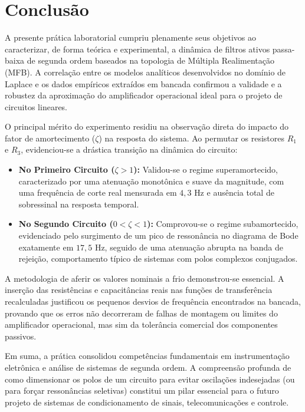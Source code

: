 \chapter{Conclusão}

A presente prática laboratorial cumpriu plenamente seus objetivos ao caracterizar, de forma teórica e experimental, a dinâmica de filtros ativos passa-baixa de segunda ordem baseados na topologia de Múltipla Realimentação (MFB). A correlação entre os modelos analíticos desenvolvidos no domínio de Laplace e os dados empíricos extraídos em bancada confirmou a validade e a robustez da aproximação do amplificador operacional ideal para o projeto de circuitos lineares.

O principal mérito do experimento residiu na observação direta do impacto do fator de amortecimento ($\zeta$) na resposta do sistema. Ao permutar os resistores $R_1$ e $R_3$, evidenciou-se a drástica transição na dinâmica do circuito:
\begin{itemize}
	\item \textbf{No Primeiro Circuito ($\zeta > 1$):} Validou-se o regime superamortecido, caracterizado por uma atenuação monotônica e suave da magnitude, com uma frequência de corte real mensurada em $4,3\text{ Hz}$ e ausência total de sobressinal na resposta temporal.
	\item \textbf{No Segundo Circuito ($0 < \zeta < 1$):} Comprovou-se o regime subamortecido, evidenciado pelo surgimento de um pico de ressonância no diagrama de Bode exatamente em $17,5\text{ Hz}$, seguido de uma atenuação abrupta na banda de rejeição, comportamento típico de sistemas com polos complexos conjugados.
\end{itemize}

A metodologia de aferir os valores nominais a frio demonstrou-se essencial. A inserção das resistências e capacitâncias reais nas funções de transferência recalculadas justificou os pequenos desvios de frequência encontrados na bancada, provando que os erros não decorreram de falhas de montagem ou limites do amplificador operacional, mas sim da tolerância comercial dos componentes passivos. 

Em suma, a prática consolidou competências fundamentais em instrumentação eletrônica e análise de sistemas de segunda ordem. A compreensão profunda de como dimensionar os polos de um circuito para evitar oscilações indesejadas (ou para forçar ressonâncias seletivas) constitui um pilar essencial para o futuro projeto de sistemas de condicionamento de sinais, telecomunicações e controle.
